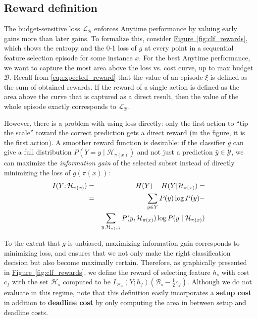\subsection{Reward definition}\label{sec:clf_reward}



The budget-sensitive loss $\mathcal{L}_\mathcal{B}$ enforces Anytime performance by valuing early gains more than later gains.
To formalize this, consider \hyperref[fig:clf_rewards]{Figure~\ref*{fig:clf_rewards}}, which shows the entropy and the 0-1 loss of $g$ at every point in a sequential feature selection episode for some instance $x$.
For the best Anytime performance, we want to capture the most area above the loss vs. cost curve, up to max budget $\mathcal{B}$.
Recall from \eqref{eq:expected_reward} that the value of an episode $\xi$ is defined as the sum of obtained rewards.
If the reward of a single action is defined as the area above the curve that is captured as a direct result, then the value of the whole episode exactly corresponds to $\mathcal{L}_\mathcal{B}$.

However, there is a problem with using loss directly: only the first action to ``tip the scale'' toward the correct prediction gets a direct reward (in the figure, it is the first action).
A smoother reward function is desirable: if the classifier $g$ can give a full distribution $P(Y = y \mid \mathcal{H}_{\pi(x)})$ and not just a prediction $\hat{y} \in \mathcal{Y}$, we can maximize the \emph{information gain} of the selected subset instead of directly minimizing the loss of $g(\pi(x))$:
\begin{eqnarray}
I(Y; \mathcal{H}_{\pi(x)}) &=& H(Y) - H(Y | \mathcal{H}_{\pi(x)}) = \\ \notag
&=& \sum_{y \in Y} P(y) \log P(y) - \\ \notag
&&\sum_{y, \mathcal{H}_{\pi(x)}} P(y, \mathcal{H}_{\pi(x)}) \log P(y \mid \mathcal{H}_{\pi(x)})
\end{eqnarray}

To the extent that $g$ is unbiased, maximizing information gain corresponds to minimizing loss, and ensures that we not only make the right classification decision but also become maximally certain.
Therefore, as graphically presented in \hyperref[fig:clf_rewards]{Figure~\ref*{fig:clf_rewards}}, we define the reward of selecting feature $h_s$ with cost $c_f$ with the set $\mathcal{H}_s$ computed to be $I_{\mathcal{H}_s}(Y; h_f) (\mathcal{B}_s - \frac{1}{2}c_f)$.
Although we do not evaluate in this regime, note that this definition easily incorporates a \textbf{setup cost} in addition to \textbf{deadline cost} by only computing the area in between setup and deadline costs.
